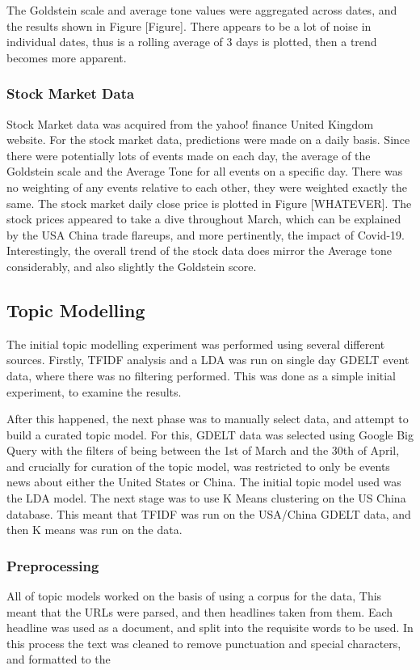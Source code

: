 The Goldstein scale and average tone values were aggregated across dates, and the results shown in Figure [Figure]. There appears to be a lot of noise in individual dates, thus is a rolling average of 3 days is plotted, then a trend becomes more apparent. 

 
\subsubsection{Stock Market Data}
Stock Market data was acquired from the yahoo! finance United Kingdom website. For the stock market data, predictions were made on a daily basis. Since there were potentially lots of events made on each day, the average of the Goldstein scale and the Average Tone for all events on a specific day. There was no weighting of any events relative to each other, they were weighted exactly the same. The stock market daily close price is plotted in Figure [WHATEVER]. The stock prices appeared to take a dive throughout March, which can be explained by the USA China trade flareups, and more pertinently, the impact of Covid-19. Interestingly, the overall trend of the stock data does mirror the Average tone considerably, and also slightly the Goldstein score. 

\subsection{Topic Modelling}

The initial topic modelling experiment was performed using several different sources. Firstly, TFIDF analysis and a LDA was run on single day GDELT event data, where there was no filtering performed. This was done as a simple initial experiment, to examine the results. 

After this happened, the next phase was to manually select data, and attempt to build a curated topic model. For this, GDELT data was selected using Google Big Query with the filters of being between the 1st of March and the 30th of April, and crucially for curation of the topic model, was restricted to only be events news about either the United States or China. The initial topic model used was the LDA model. The next stage was to use K Means clustering on  the US China database. This meant that TFIDF was run on the USA/China GDELT data, and then K means was run on the data.

\subsubsection{Preprocessing}
All of topic models worked on the basis of using a corpus for the data, This meant that the URLs were parsed, and then headlines taken from them. Each headline was used as a document, and split into the requisite words to be used. In this process the text was cleaned to remove punctuation and special characters, and formatted to the 
